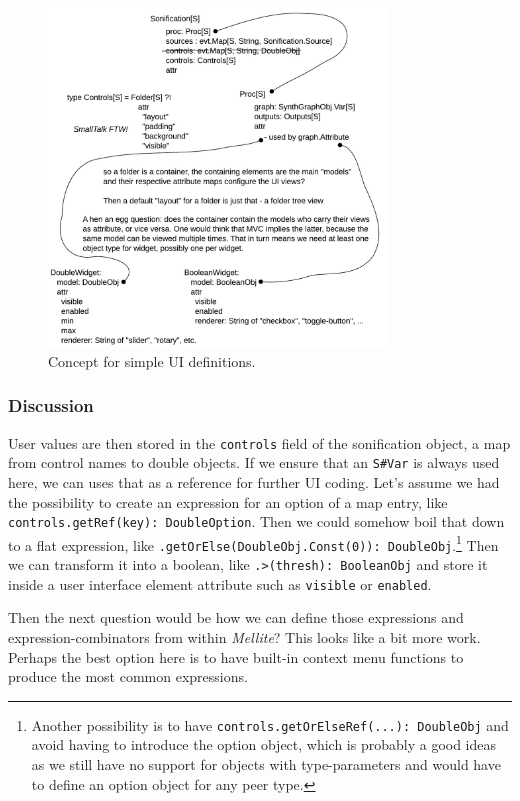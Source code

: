 \documentclass[11pt,a4paper]{article}
\newcommand{\software}[1]{\textit{#1}}
\begin{document}
\begin{figure}%
\centering%
\includegraphics[width=0.8\textwidth]{figures/discuss_ui.pdf}%
\caption{Concept for simple UI definitions.}%
\label{fig:ui}%
\end{figure}

\subsubsection*{Discussion}

User values are then stored in the \verb!controls! field of the sonification object, a map from control names to double objects. If we ensure that an \verb!S#Var! is always used here, we can uses that as a reference for further UI coding. Let's assume we had the possibility to create an expression for an option of a map entry, like \verb!controls.getRef(key): DoubleOption!. Then we could somehow boil that down to a flat expression, like \verb!.getOrElse(DoubleObj.Const(0)): DoubleObj!.\footnote{Another possibility is to have \verb!controls.getOrElseRef(...): DoubleObj! and avoid having to introduce the option object, which is probably a good ideas as we still have no support for objects with type-parameters and would have to define an option object for any peer type.} Then we can transform it into a boolean, like \verb!.>(thresh): BooleanObj! and store it inside a user interface element attribute such as \verb!visible! or \verb!enabled!.

Then the next question would be how we can define those expressions and expression-combinators from within \software{Mellite}? This looks like a bit more work. Perhaps the best option here is to have built-in context menu functions to produce the most common expressions.
\end{document}
